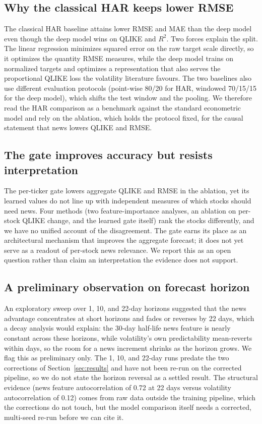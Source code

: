 \documentclass[runningheads]{llncs}
\begin{document}
\subsection{Why the classical HAR keeps lower RMSE}
The classical HAR baseline attains lower RMSE and MAE than the deep model even though the deep model
wins on QLIKE and $R^2$. Two forces explain the split. The linear regression minimizes squared
error on the raw target scale directly, so it optimizes the quantity RMSE measures, while
the deep model trains on normalized targets and optimizes a representation that also serves the
proportional QLIKE loss the volatility literature favours. The two baselines also use different
evaluation protocols (point-wise 80/20 for HAR, windowed 70/15/15 for the deep model), which shifts
the test window and the pooling. We therefore read the HAR comparison as a benchmark against the
standard econometric model and rely on the ablation, which holds the protocol fixed, for the causal
statement that news lowers QLIKE and RMSE.

\subsection{The gate improves accuracy but resists interpretation}
The per-ticker gate lowers aggregate QLIKE and RMSE in the ablation, yet its learned values do not
line up with independent measures of which stocks should need news. Four methods (two
feature-importance analyses, an ablation on per-stock QLIKE change, and the learned gate itself)
rank the stocks differently, and we have no unified account of the disagreement. The gate earns its
place as an architectural mechanism that improves the aggregate forecast; it does not yet serve as a
readout of per-stock news relevance. We report this as an open question rather than claim an
interpretation the evidence does not support.

\subsection{A preliminary observation on forecast horizon}
An exploratory sweep over 1, 10, and 22-day horizons suggested that the news advantage concentrates
at short horizons and fades or reverses by 22 days, which a decay analysis would explain: the
30-day half-life news feature is nearly constant across these horizons, while volatility's own
predictability mean-reverts within days, so the room for a news increment shrinks as the horizon
grows. We flag this as preliminary only. The 1, 10, and 22-day runs predate the two corrections of
Section~\ref{sec:results} and have not been re-run on the corrected pipeline, so we do not state the
horizon reversal as a settled result. The structural evidence (news feature autocorrelation of 0.72
at 22 days versus volatility autocorrelation of 0.12) comes from raw data outside the training
pipeline, which the corrections do not touch, but the model comparison itself needs a
corrected, multi-seed re-run before we can cite it.
\end{document}
